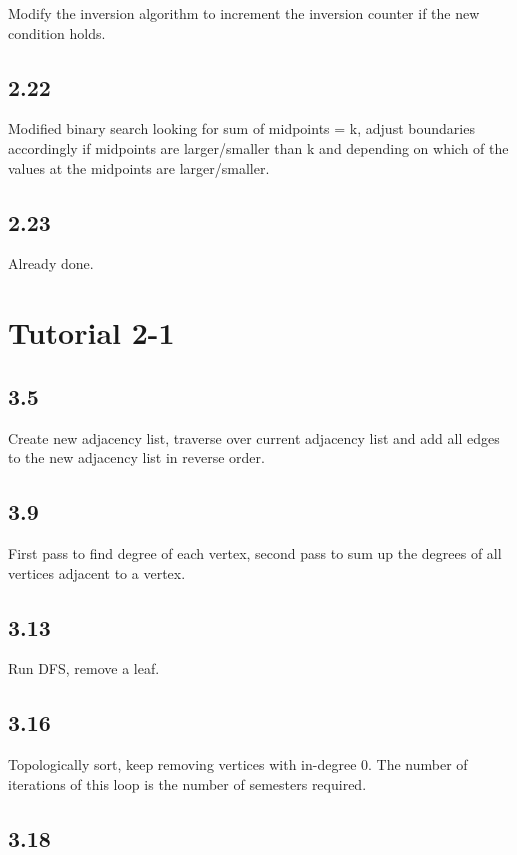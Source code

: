 \documentclass[11pt]{article}
\begin{document}
Modify the inversion algorithm to increment the inversion counter if the new condition holds.

\subsection{2.22}

Modified binary search looking for sum of midpoints = k, adjust boundaries accordingly if midpoints are larger/smaller than k and depending on which of the values at the midpoints are larger/smaller.

\subsection{2.23}

Already done.

\section{Tutorial 2-1}

\subsection{3.5}

Create new adjacency list, traverse over current adjacency list and add all edges to the new adjacency list in reverse order.

\subsection{3.9}

First pass to find degree of each vertex, second pass to sum up the degrees of all vertices adjacent to a vertex.

\subsection{3.13}

Run DFS, remove a leaf.

\subsection{3.16}

Topologically sort, keep removing vertices with in-degree 0. The number of iterations of this loop is the number of semesters required.

\subsection{3.18}
\end{document}
